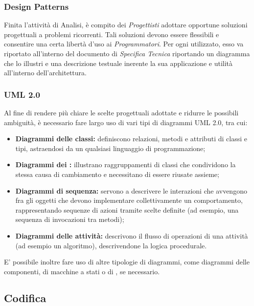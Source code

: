 \documentclass[../NomeDocumento.tex]{subfiles}
\begin{document}
	\subsubsection{Design Patterns}
	
	Finita l'attività di Analisi, è compito dei \textit{Progettisti} adottare opportune soluzioni progettuali a problemi ricorrenti. Tali soluzioni devono essere flessibili e consentire una certa libertà d'uso ai \textit{Programmatori}. Per ogni  utilizzato, esso va riportato all'interno del documento di \textit{Specifica Tecnica} riportando un diagramma che lo illustri e una descrizione testuale inerente la sua applicazione e utilità all'interno dell'architettura.
	
	\subsubsection{UML 2.0}
	
		Al fine di rendere più chiare le scelte progettuali adottate e ridurre le possibili ambiguità, è necessario fare largo uso di vari tipi di diagrammi UML 2.0, tra cui:
	
	\begin{itemize}
		\item \textbf{Diagrammi delle classi:} definiscono relazioni, metodi e attributi di classi e tipi, astraendosi da un qualsiasi linguaggio di programmazione;
		\item \textbf{Diagrammi dei :} illustrano raggruppamenti di classi che condividono la stessa causa di cambiamento e necessitano di essere riusate assieme;
		\item \textbf{Diagrammi di sequenza:} servono a descrivere le interazioni che avvengono fra gli oggetti che devono implementare collettivamente un comportamento, rappresentando sequenze di azioni tramite scelte definite (ad esempio, una sequenza di invocazioni tra metodi);
		\item \textbf{Diagrammi delle attività:} descrivono il flusso di operazioni di una attività (ad esempio un algoritmo), descrivendone la logica procedurale.
	\end{itemize}

	\noindent E' possibile inoltre fare uso di altre tipologie di diagrammi, come diagrammi delle componenti, di macchine a stati o di , se necessario.
	
	\subsection{Codifica}
	
\end{document}
